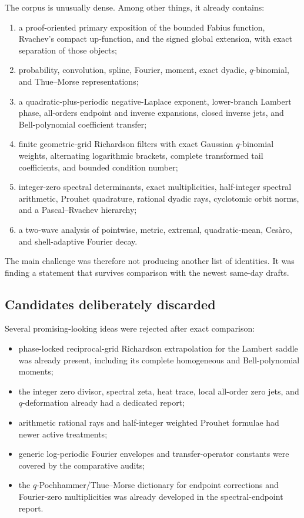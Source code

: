 \documentclass[11pt,oneside]{article}
\numberwithin{equation}{section}
\theoremstyle{frontier}
\theoremstyle{definition}
\theoremstyle{remark}
\begin{document}
The corpus is unusually dense.  Among other things, it already contains:
\begin{enumerate}
\item a proof-oriented primary exposition of the bounded Fabius function, Rvachev's compact
      up-function, and the signed global extension, with exact separation of those objects;
\item probability, convolution, spline, Fourier, moment, exact dyadic, $q$-binomial, and
      Thue--Morse representations;
\item a quadratic-plus-periodic negative-Laplace exponent, lower-branch Lambert phase,
      all-orders endpoint and inverse expansions, closed inverse jets, and Bell-polynomial
      coefficient transfer;
\item finite geometric-grid Richardson filters with exact Gaussian $q$-binomial weights,
      alternating logarithmic brackets, complete transformed tail coefficients, and bounded
      condition number;
\item integer-zero spectral determinants, exact multiplicities, half-integer spectral
      arithmetic, Prouhet quadrature, rational dyadic rays, cyclotomic orbit norms, and a
      Pascal--Rvachev hierarchy;
\item a two-wave analysis of pointwise, metric, extremal, quadratic-mean, Ces\`aro, and
      shell-adaptive Fourier decay.
\end{enumerate}
The main challenge was therefore not producing another list of identities.  It was finding a
statement that survives comparison with the newest same-day drafts.

\subsection{Candidates deliberately discarded}

Several promising-looking ideas were rejected after exact comparison:
\begin{itemize}
\item phase-locked reciprocal-grid Richardson extrapolation for the Lambert saddle was
      already present, including its complete homogeneous and Bell-polynomial moments;
\item the integer zero divisor, spectral zeta, heat trace, local all-order zero jets, and
      $q$-deformation already had a dedicated report;
\item arithmetic rational rays and half-integer weighted Prouhet formulae had newer active
      treatments;
\item generic log-periodic Fourier envelopes and transfer-operator constants were covered by
      the comparative audits;
\item the $q$-Pochhammer/Thue--Morse dictionary for endpoint corrections and Fourier-zero
      multiplicities was already developed in the spectral-endpoint report.
\end{itemize}
\end{document}

